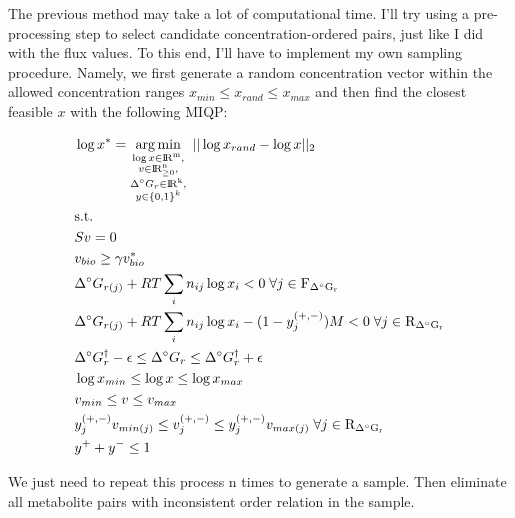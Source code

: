 \documentclass[12pt]{article}
\DeclareMathOperator*{\argmin}{arg\,min}
\begin{document}
  The previous method may take a lot of computational time. I'll try using a pre-processing step to select candidate concentration-ordered pairs, just like I did with the flux values. To this end, I'll have to implement my own sampling procedure. Namely, we first generate a random concentration vector within the allowed concentration ranges $x_{min} \leq x_{rand} \leq x_{max}$ and then find the closest feasible $x$ with the following MIQP:

  \begin{align}
    \begin{aligned}
      \label{eq:9}
      &\log x^* = \argmin_{\substack{ \log{x} \in \rm I\!R^m, \\
                            v \in \rm I\!R^n_{\geq 0}, \\
                            \Delta^{\circ} G_{r} \in \rm I\!R^k, \\
                            y \in \{0, 1\}^k }} \; ||\log{x_{rand}} - \log{x}||_2
      \\
      &\mathrm{s.t.}
      \\
      &Sv = 0
      \\
      &v_{bio} \geq \gamma v^*_{bio}
      \\
      &\Delta^{\circ} G_{r(j)} + RT \sum_i n_{ij} \log{x_i} < 0 \; \forall j \in \mathrm{F_{\Delta^{\circ} G_{r}}}
      \\
      &\Delta^{\circ} G_{r(j)} + RT \sum_i n_{ij} \log{x_i} - (1 - y_j^{(+, -)})M< 0 \; \forall j \in \mathrm{R_{\Delta^{\circ} G_{r}}}
      \\
      &\Delta^{\circ} G_{r}^{\dagger} - \epsilon \leq \Delta^{\circ} G_{r} \leq \Delta^{\circ} G_{r}^{\dagger} + \epsilon
      \\
      &\log{x}_{min} \leq \log{x} \leq \log{x}_{max}
      \\
      &v_{min} \leq v \leq v_{max}
      \\
      &y_j^{(+, -)} v_{min(j)} \leq v^{(+, -)}_j \leq y_j^{(+, -)} v_{max(j)} \; \forall j \in \mathrm{R_{\Delta^{\circ} G_{r}}}
      \\
      &y^+ + y^- \leq 1
    \end{aligned}
  \end{align}

  We just need to repeat this process n times to generate a sample. Then eliminate all metabolite pairs with inconsistent order relation in the sample.





  
\end{document}
